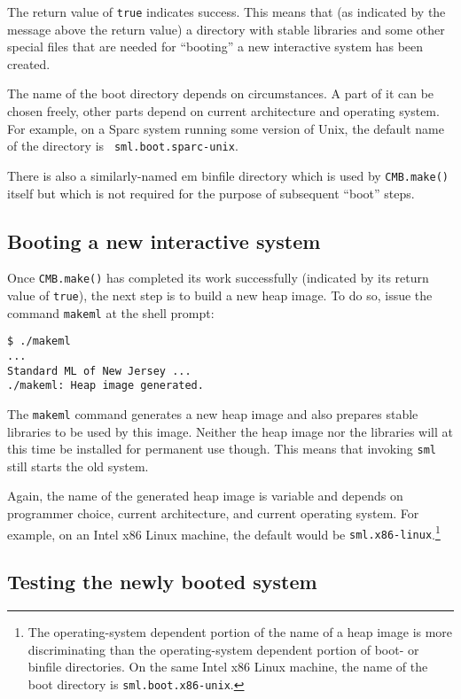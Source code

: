 The return value of {\tt true} indicates success.  This means that (as
indicated by the message above the return value) a directory with
stable libraries and some other special files that are needed for
``booting'' a new interactive system has been created.

The name of the boot directory depends on circumstances.  A part of it
can be chosen freely, other parts depend on current architecture and
operating system.  For example, on a Sparc system running some version
of Unix, the default name of the directory is {\tt
sml.boot.sparc-unix}.

There is also a similarly-named {em binfile directory} which is used
by {\tt CMB.make()} itself but which is not required for the purpose
of subsequent ``boot'' steps.

\subsection{Booting a new interactive system}

Once {\tt CMB.make()} has completed its work successfully (indicated
by its return value of {\tt true}), the next step is to build a new
heap image.  To do so, issue the command {\tt makeml} at the shell
prompt:

\begin{verbatim}
$ ./makeml
...
Standard ML of New Jersey ...
./makeml: Heap image generated.
\end{verbatim}

The {\tt makeml} command generates a new heap image and also prepares
stable libraries to be used by this image.  Neither the heap image nor
the libraries will at this time be installed for permanent use
though.  This means that invoking {\tt sml} still starts the old
system.

Again, the name of the generated heap image is variable and depends on
programmer choice, current architecture, and current operating
system.  For example, on an Intel x86 Linux machine, the default would
be {\tt sml.x86-linux}.\footnote{The operating-system dependent
portion of the name of a heap image is more discriminating than the
operating-system dependent portion of boot- or binfile directories.
On the same Intel x86 Linux machine, the name of the boot directory is
{\tt sml.boot.x86-unix}.}

\subsection{Testing the newly booted system}

